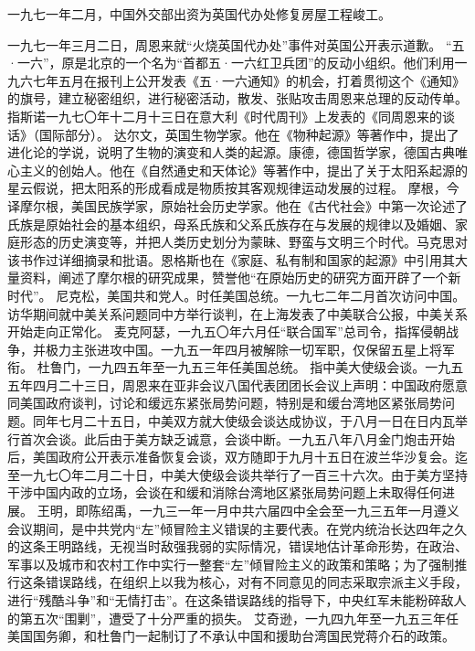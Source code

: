 \begin{maonote}
一九七一年二月，中国外交部出资为英国代办处修复房屋工程峻工。

一九七一年三月二日，周恩来就“火烧英国代办处”事件对英国公开表示道歉。
“五·一六”，原是北京的一个名为“首都五·一六红卫兵团”的反动小组织。他们利用一九六七年五月在报刊上公开发表《五·一六通知》的机会，打着贯彻这个《通知》的旗号，建立秘密组织，进行秘密活动，散发、张贴攻击周恩来总理的反动传单。
指斯诺一九七〇年十二月十三日在意大利《时代周刊》上发表的《同周恩来的谈话》（国际部分）。
达尔文，英国生物学家。他在《物种起源》等著作中，提出了进化论的学说，说明了生物的演变和人类的起源。康德，德国哲学家，德国古典唯心主义的创始人。他在《自然通史和天体论》等著作中，提出了关于太阳系起源的星云假说，把太阳系的形成看成是物质按其客观规律运动发展的过程。
摩根，今译摩尔根，美国民族学家，原始社会历史学家。他在《古代社会》中第一次论述了氏族是原始社会的基本组织，母系氏族和父系氏族存在与发展的规律以及婚姻、家庭形态的历史演变等，并把人类历史划分为蒙昧、野蛮与文明三个时代。马克思对该书作过详细摘录和批语。恩格斯也在《家庭、私有制和国家的起源》中引用其大量资料，阐述了摩尔根的研究成果，赞誉他“在原始历史的研究方面开辟了一个新时代”。
尼克松，美国共和党人。时任美国总统。一九七二年二月首次访问中国。访华期间就中美关系问题同中方举行谈判，在上海发表了中美联合公报，中美关系开始走向正常化。
麦克阿瑟，一九五〇年六月任“联合国军”总司令，指挥侵朝战争，并极力主张进攻中国。一九五一年四月被解除一切军职，仅保留五星上将军衔。
杜鲁门，一九四五年至一九五三年任美国总统。
指中美大使级会谈。一九五五年四月二十三日，周恩来在亚非会议八国代表团团长会议上声明：中国政府愿意同美国政府谈判，讨论和缓远东紧张局势问题，特别是和缓台湾地区紧张局势问题。同年七月二十五日，中美双方就大使级会谈达成协议，于八月一日在日内瓦举行首次会谈。此后由于美方缺乏诚意，会谈中断。一九五八年八月金门炮击开始后，美国政府公开表示准备恢复会谈，双方随即于九月十五日在波兰华沙复会。迄至一九七〇年二月二十日，中美大使级会谈共举行了一百三十六次。由于美方坚持干涉中国内政的立场，会谈在和缓和消除台湾地区紧张局势问题上未取得任何进展。
王明，即陈绍禹，一九三一年一月中共六届四中全会至一九三五年一月遵义会议期间，是中共党内“左”倾冒险主义错误的主要代表。在党内统治长达四年之久的这条王明路线，无视当时敌强我弱的实际情况，错误地估计革命形势，在政治、军事以及城市和农村工作中实行一整套“左”倾冒险主义的政策和策略；为了强制推行这条错误路线，在组织上以我为核心，对有不同意见的同志采取宗派主义手段，进行“残酷斗争”和“无情打击”。在这条错误路线的指导下，中央红军未能粉碎敌人的第五次“围剿”，遭受了十分严重的损失。
艾奇逊，一九四九年至一九五三年任美国国务卿，和杜鲁门一起制订了不承认中国和援助台湾国民党蒋介石的政策。

\end{maonote}
